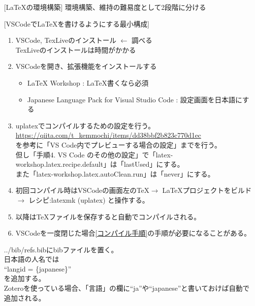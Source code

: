\documentclass[uplatex, a4paper, dvipdfmx, 12pt]{jsreport}
\begin{document}
[LaTeXの環境構築]
	環境構築、維持の難易度として2段階に分ける

	[VSCodeでLaTeXを書けるようにする最小構成]
		\begin{enumerate}
			\item VSCode, TexLiveのインストール $\leftarrow$ 調べる\\
					TexLiveのインストールは時間がかかる
			\item VSCodeを開き、拡張機能をインストールする
					\begin{itemize}
						\item LaTeX Workshop : LaTeX書くなら必須
						\item Japanese Language Pack for Visual Studio Code : 設定画面を日本語にする
					\end{itemize}
			\item uplatexでコンパイルするための設定を行う。\\
					\url{https://qiita.com/t_kemmochi/items/dd38bbf2b823c770d1ec}\\
					を参考に「VS Code内でプレビューする場合の設定」までを行う。\\
					但し「手順4. VS Code のその他の設定」で「latex-workshop.latex.recipe.default」は「lastUsed」にする。\\
					また「latex-workshop.latex.autoClean.run」は「never」にする。
			\item 初回コンパイル時はVSCodeの画面左の\TeX $\to$ \LaTeX プロジェクトをビルド $\to$ レシピ:latexmk (uplatex) と操作する。\label{コンパイル手順}
			\item 以降は\TeX ファイルを保存すると自動でコンパイルされる。
			\item VSCodeを一度閉じた場合\ref{コンパイル手順}の手順が必要になることがある。
		\end{enumerate}

			../bib/refs.bibにbibファイルを置く。\\
			日本語の人名では\\
			``langid = \{japanese\}''\\
			を追加する。\\
			Zoteroを使っている場合、「言語」の欄に``ja''や``japanese''と書いておけば自動で追加される。
\end{document}
